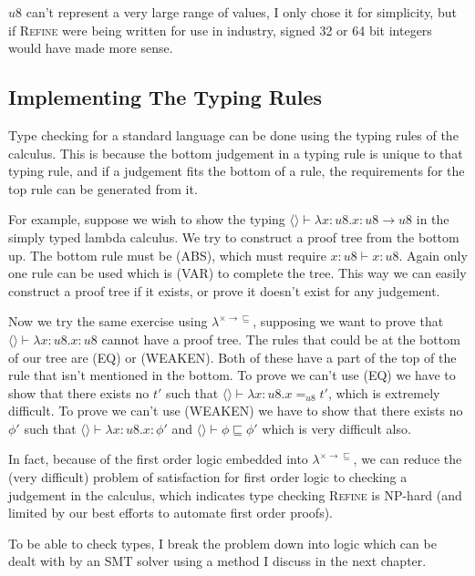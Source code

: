 $u8$ can't represent a very large range of values, I only chose it for simplicity, but if \textsc{Refine}
were being written for use in industry, signed 32 or 64 bit integers would have made more sense.

\subsection{Implementing The Typing Rules}

Type checking for a standard language can be done using the typing rules of the calculus.
This is because the bottom judgement in a typing rule is unique to that typing rule, and if a judgement
fits the bottom of a rule, the requirements for the top rule can be generated from it.

For example, suppose we wish to show the typing $\langle \rangle \vdash \lambda x: u8 . x: u8 \rightarrow u8$
in the simply typed lambda calculus.
We try to construct a proof tree from the bottom up.
The bottom rule must be (ABS), which must require $x:u8 \vdash x : u8$.
Again only one rule can be used which is (VAR) to complete the tree.
This way we can easily construct a proof tree if it exists, or prove it doesn't exist for any judgement.

Now we try the same exercise using $\lambda^{\times \rightarrow \sqsubseteq}$,
supposing we want to prove that $\langle \rangle \vdash \lambda x: u8 . x : u8$ cannot have a proof tree.
The rules that could be at the bottom of our tree are (EQ) or (WEAKEN).
Both of these have a part of the top of the rule that isn't mentioned in the bottom.
To prove we can't use (EQ) we have to show that there exists no $t'$ such that
$\langle \rangle \vdash \lambda x: u8 . x =_{u8} t'$, which is extremely difficult.
To prove we can't use (WEAKEN) we have to show that there exists no $\phi'$ such that
$\langle \rangle \vdash \lambda x: u8 . x : \phi'$ and $\langle \rangle \vdash \phi \sqsubseteq \phi'$
which is very difficult also.

In fact, because of the first order logic embedded into
$\lambda^{\times \rightarrow \sqsubseteq}$, we can reduce the (very difficult)
problem of satisfaction for first order logic to checking a judgement in the calculus, which
indicates type checking \textsc{Refine} is NP-hard (and limited by our best efforts to automate first order proofs).

To be able to check types, I break the problem down into logic which can be dealt with by an SMT
solver using a method I discuss in the next chapter.

